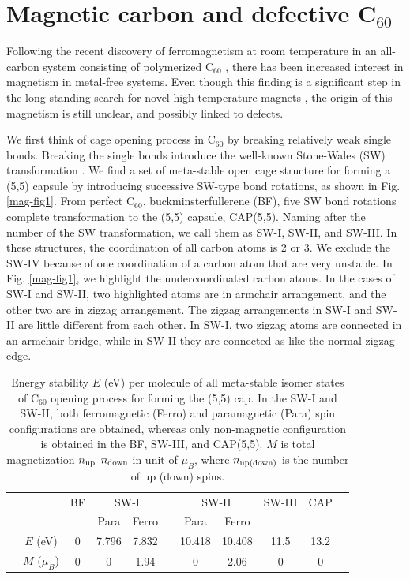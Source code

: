 \documentclass[doctor,english,final]{kaist-ucs}
\begin{document}
\section{Magnetic carbon and defective C$_{60}$}

Following the recent discovery of ferromagnetism at room temperature
in an all-carbon system consisting of polymerized C$_{60}$
\cite{Makarova01}, there has been increased interest in magnetism in
metal-free systems.
Even though this finding is a significant step in
the long-standing search for novel high-temperature magnets
\cite{Palacio01}, the origin of this magnetism is still unclear, and
possibly linked to defects.

We first think of cage opening process in C$_{60}$ by breaking relatively weak
single bonds. Breaking the single bonds introduce the well-known Stone-Wales (SW)
transformation \cite{SW}.
We find a set of meta-stable open cage structure for forming a (5,5) capsule
by introducing successive SW-type bond rotations, as shown in Fig. \ref{mag-fig1}.
From perfect C$_{60}$, buckminsterfullerene (BF), five SW bond rotations complete
transformation to the (5,5) capsule, CAP(5,5).
Naming after the number of the SW transformation, we call them as SW-I, SW-II, and
SW-III.
In these structures, the coordination of all carbon atoms is 2 or 3.
We exclude the SW-IV because of one coordination of a carbon atom that are very
unstable.
In Fig. \ref{mag-fig1}, we highlight the undercoordinated carbon atoms.
In the cases of SW-I and SW-II, two highlighted atoms are in armchair arrangement,
and the other two are in zigzag arrangement.
The zigzag arrangements in SW-I and SW-II are little different from each other.
In SW-I, two zigzag atoms are connected in an armchair bridge, while in SW-II they
are connected as like the normal zigzag edge.

\begin{table}[t]
\caption{Energy stability $E$ (eV) per molecule of all meta-stable
isomer states of C$_{60}$ opening process for forming the (5,5) cap.
In the SW-I and SW-II, both ferromagnetic (Ferro) and paramagnetic (Para)
spin configurations are obtained, whereas only non-magnetic configuration
is obtained in the BF, SW-III, and CAP(5,5).
$M$ is total magnetization $n_{\rm up}$-$n_{\rm down}$ in unit of $\mu_B$, where
$n_{\rm up(down)}$ is the number of up (down) spins.
}
\label{mag-tab1}
\begin{center}
\begin{tabular} {ccccccccccc}
\hline\hline
& & BF &\multicolumn{2}{c}{SW-I}&&\multicolumn{2}{c}{SW-II}&SW-III&CAP&\\
\cline{4-5} \cline{7-8}
&               &   &  Para & Ferro &&   Para &  Ferro &      &      &\\
\hline
& $E$ (eV)      & 0 & 7.796 & 7.832 && 10.418 & 10.408 & 11.5 & 13.2 &\\
& $M$ ($\mu_B$) & 0 &     0 &  1.94 &&      0 &   2.06 &    0 &    0 &\\
\hline\hline
\end{tabular}
\end{center}
\end{table}
\end{document}
